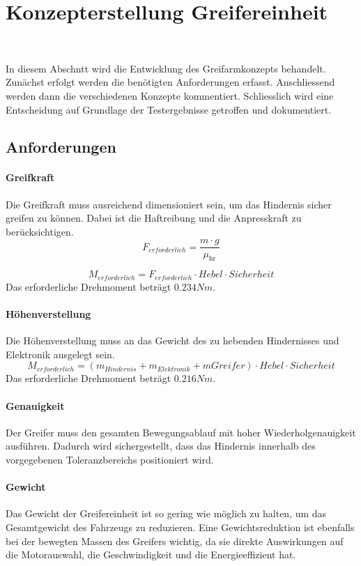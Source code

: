 \documentclass[main.tex]{subfiles} %
\begin{document}
\section{Konzepterstellung Greifereinheit}~\label{appendix:Greifereinheit}

In diesem Abschntt wird die Entwicklung des Greifarmkonzepts behandelt.
Zunächst erfolgt werden die benötigten Anforderungen erfasst. 
Anschliessend werden dann die verschiedenen Konzepte kommentiert.
Schliesslich wird eine Entscheidung auf Grundlage der Testergebnisse getroffen und dokumentiert.

\subsection*{Anforderungen}

\paragraph{Greifkraft}
Die Greifkraft muss ausreichend dimensioniert sein, um das Hindernis sicher greifen zu können.
Dabei ist die Haftreibung und die Anpresskraft zu berücksichtigen.
\[
    F_{erforderlich} = \frac{m \cdot g}{\mu_{\text{hr}}}
\]

\[
    M_{erforderlich} = F_{erforderlich} \cdot Hebel \cdot Sicherheit
\]
Das erforderliche Drehmoment beträgt $0.234 Nm$.

\paragraph{Höhenverstellung}
Die Höhenverstellung muss an das Gewicht des zu hebenden Hindernisses und Elektronik ausgelegt sein.
\[
    M_{erforderlich} = (m_{Hindernis} + m_{Elektronik} + m{Greifer}) \cdot Hebel \cdot Sicherheit
\]
Das erforderliche Drehmoment beträgt $0.216 Nm$.

\paragraph{Genauigkeit}
Der Greifer muss den gesamten Bewegungsablauf mit hoher Wiederholgenauigkeit ausführen.
Dadurch wird sichergestellt, dass das Hindernis innerhalb des vorgegebenen Toleranzbereichs
positioniert wird.

\paragraph{Gewicht}
Das Gewicht der Greifereinheit ist so gering wie möglich zu halten, um das Gesamtgewicht des Fahrzeugs zu
reduzieren. Eine Gewichtsreduktion ist ebenfalls bei der bewegten Massen des Greifers wichtig, da sie
direkte Auswirkungen auf die Motorauswahl, die Geschwindigkeit und die Energieeffizient hat.
\end{document}
